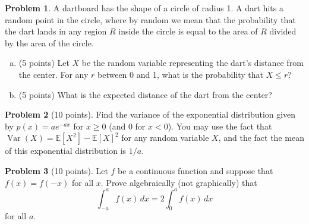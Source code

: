 \documentclass[11pt,oneside]{amsart}
\theoremstyle{definition}
\newtheorem{problem}{Problem}
\newcommand{\bE}{\mathbb{E}}
\DeclareMathOperator{\Var}{Var}
\begin{document}
\newpage

\begin{problem}
A dartboard has the shape of a circle of radius 1. A dart hits a random point in the circle, where by random we mean that the probability that the dart lands in any region $R$ inside the circle is equal to the area of $R$ divided by the area of the circle.
\begin{enumerate}[(a)]
    \item (5 points) Let $X$ be the random variable representing the dart's distance from the center. For any $r$ between 0 and 1, what is the probability that $X\leq r$?
          \vfill
    \item (5 points) What is the expected distance of the dart from the center?
          \vfill
\end{enumerate}
\end{problem}

\newpage

\begin{problem}[10 points]
Find the variance of the exponential distribution given by $p(x)=ae^{-ax}$ for $x\geq 0$ (and 0 for $x<0$). You may use the fact that $\Var(X)=\bE[X^2]-\bE[X]^2$ for any random variable $X$, and the fact the mean of this exponential distribution is $1/a$.
\end{problem}

\newpage

\begin{problem}[10 points]
Let $f$ be a continuous function and suppose that $f(x)=f(-x)$ for all $x$. Prove algebraically (not graphically) that
\[\int_{-a}^a f(x)\,dx=2\int_0^a f(x)\,dx\]
for all $a$.
\end{problem}
\end{document}
